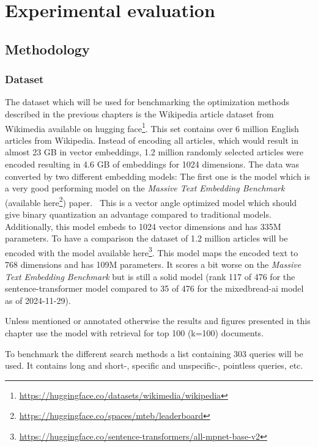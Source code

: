 \chapter{Experimental evaluation}
\label{chapter:exp_eval}
\section{Methodology}
\subsection{Dataset}
The dataset which will be used for benchmarking the optimization methods described in the previous chapters is the Wikipedia article dataset from Wikimedia available on hugging face\footnote{\url{https://huggingface.co/datasets/wikimedia/wikipedia}}.
This set contains over 6 million English articles from Wikipedia.
Instead of encoding all articles, which would result in almost 23 GB in vector embeddings, 1.2 million randomly selected articles were encoded resulting in 4.6 GB of embeddings for 1024 dimensions.
The data was converted by two different embedding models: The first one is the \texttt{} model which is a very good performing model on the \textit{Massive Text Embedding Benchmark} (available here\footnote{\url{https://huggingface.co/spaces/mteb/leaderboard}}) paper.~\cite{muennighoff2023mtebmassivetextembedding} This is a vector angle optimized model \cite{li2024angleoptimizedtextembeddings} which should give binary quantization an advantage compared to traditional models. Additionally, this model embeds to 1024 vector dimensions and has 335M parameters. To have a comparison the dataset of 1.2 million articles will be encoded with the \texttt{} model available here\footnote{\url{https://huggingface.co/sentence-transformers/all-mpnet-base-v2}}. This model maps the encoded text to 768 dimensions and has 109M parameters. It scores a bit worse on the \textit{Massive Text Embedding Benchmark} but is still a solid model (rank 117 of 476 for the sentence-transformer model compared to 35 of 476 for the mixedbread-ai model as of 2024-11-29).

Unless mentioned or annotated otherwise the results and figures presented in this chapter use the \texttt{} model with retrieval for top 100 (k=100) documents.

To benchmark the different search methods a list containing 303 queries will be used. It contains long and short-, specific and unspecific-, pointless queries, etc.

